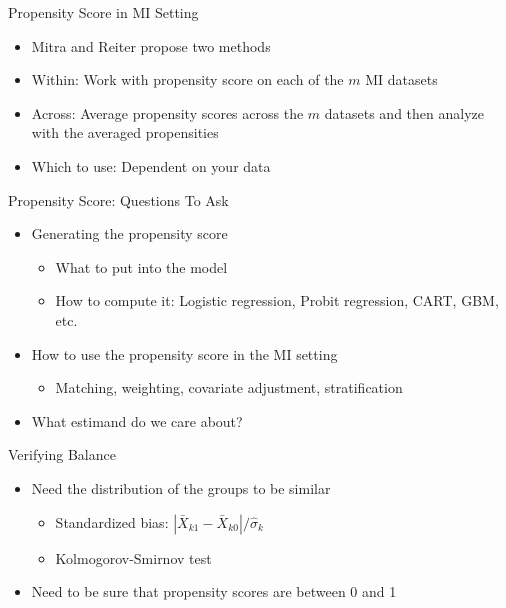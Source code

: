 \begin{frame}{Propensity Score in MI Setting}
\begin{itemize}
 \item Mitra and Reiter propose two methods \cite{Mitra2012}
 \item Within: Work with propensity score on each of the $m$ MI datasets
 \item Across: Average propensity scores across the $m$ datasets and then analyze with the averaged propensities
 \item Which to use: Dependent on your data
\end{itemize} 
\end{frame}

\begin{frame}{Propensity Score: Questions To Ask}
\begin{itemize}
\item Generating the propensity score
\begin{itemize}
\item What to put into the model
 \item How to compute it: Logistic regression, Probit regression, CART, GBM, etc.
\end{itemize}
\item How to use the propensity score in the MI setting
 \begin{itemize}
  \item Matching, weighting, covariate adjustment, stratification
 \end{itemize}
\item What estimand do we care about?
\end{itemize} 
\end{frame}



\begin{frame}{Verifying Balance}
\begin{itemize}
\item Need the distribution of the groups to be similar
\begin{itemize}
\item Standardized bias: $|\bar{X}_{k1}-\bar{X}_{k0}|/ \hat{\sigma}_k$
\item Kolmogorov-Smirnov test 
\end{itemize}
\item Need to be sure that propensity scores are between 0 and 1
\end{itemize}
\end{frame}

